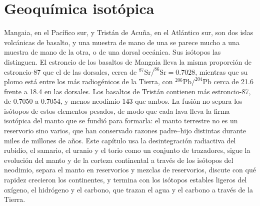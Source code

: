 \chapter{Geoquímica isotópica}\label{ch:b2:isotope-geochemistry}

Mangaia, en el Pacífico sur, y Tristán de Acuña, en el Atlántico
sur, son dos islas volcánicas de basalto, y una muestra de mano de
una se parece mucho a una muestra de mano de la otra, o de una dorsal oceánica.
Sus isótopos las distinguen. El estroncio de los basaltos de Mangaia lleva
la misma proporción de estroncio-87 que el de las dorsales, cerca de
$^{87}\mathrm{Sr}/^{86}\mathrm{Sr} = 0.7028$, mientras que su plomo está entre los más
radiogénicos de la Tierra, con $^{206}\mathrm{Pb}/^{204}\mathrm{Pb}$ cerca de 21.6 frente a
18.4 en las dorsales. Los basaltos de Tristán contienen más estroncio-87, de 0.7050 a
0.7054, y menos neodimio-143 que ambos. La fusión no separa los isótopos de
estos elementos pesados, de modo que cada lava lleva la firma isotópica del
manto que se fundió para formarla: el manto terrestre no es un reservorio sino
varios, que han conservado razones padre--hijo distintas durante miles de millones de
años. Este capítulo usa la desintegración radiactiva del rubidio, el samario, el uranio
y el torio como un conjunto de trazadores, sigue la evolución del manto y de la
corteza continental a través de los isótopos del neodimio, separa el manto en
reservorios y mezclas de reservorios, discute con qué rapidez crecieron los continentes,
y termina con los isótopos estables ligeros del oxígeno, el hidrógeno y el carbono, que
trazan el agua y el carbono a través de la Tierra.

